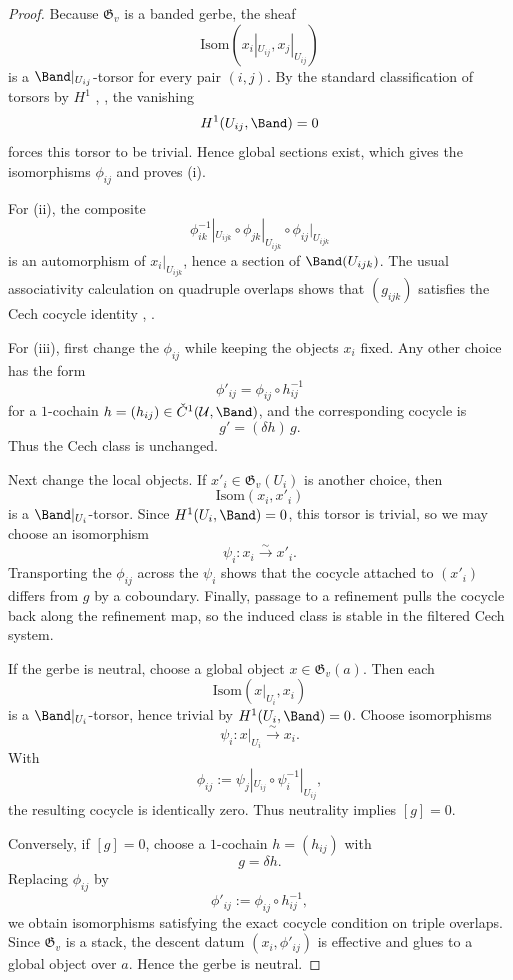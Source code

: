 \begin{proof}
Because $\mathfrak G_v$ is a banded gerbe, the sheaf
\[
\mathrm{Isom}(x_i|_{U_{ij}},x_j|_{U_{ij}})
\]
is a $\Band|_{U_{ij}}$-torsor for every pair $(i,j)$. By the standard classification of torsors by $H^1$ \cite[Chap.~III]{MacLaneMoerdijk1994}, \cite[Sec.~11]{StacksProject}, the vanishing
\[
H^1(U_{ij},\Band)=0
\]
forces this torsor to be trivial. Hence global sections exist, which gives the isomorphisms $\phi_{ij}$ and proves \textup{(i)}.

For \textup{(ii)}, the composite
\[
\phi_{ik}^{-1}|_{U_{ijk}}\circ \phi_{jk}|_{U_{ijk}}\circ \phi_{ij}|_{U_{ijk}}
\]
is an automorphism of $x_i|_{U_{ijk}}$, hence a section of $\Band(U_{ijk})$. The usual associativity calculation on quadruple overlaps shows that $(g_{ijk})$ satisfies the Cech cocycle identity \cite[Chap.~IV]{Giraud1971}, \cite[Sec.~11]{StacksProject}.

For \textup{(iii)}, first change the $\phi_{ij}$ while keeping the objects $x_i$ fixed. Any other choice has the form
\[
\phi'_{ij}=\phi_{ij}\circ h_{ij}^{-1}
\]
for a $1$-cochain $h=(h_{ij})\in \check C^1(\mathcal U,\Band)$, and the corresponding cocycle is
\[
g'=(\delta h)\, g.
\]
Thus the Cech class is unchanged.

Next change the local objects. If $x'_i\in \mathfrak G_v(U_i)$ is another choice, then
\[
\mathrm{Isom}(x_i,x'_i)
\]
is a $\Band|_{U_i}$-torsor. Since $H^1(U_i,\Band)=0$, this torsor is trivial, so we may choose an isomorphism
\[
\psi_i:x_i\xrightarrow{\sim} x'_i.
\]
Transporting the $\phi_{ij}$ across the $\psi_i$ shows that the cocycle attached to $(x'_i)$ differs from $g$ by a coboundary. Finally, passage to a refinement pulls the cocycle back along the refinement map, so the induced class is stable in the filtered Cech system.

If the gerbe is neutral, choose a global object $x\in \mathfrak G_v(a)$. Then each
\[
\mathrm{Isom}(x|_{U_i},x_i)
\]
is a $\Band|_{U_i}$-torsor, hence trivial by $H^1(U_i,\Band)=0$. Choose isomorphisms
\[
\psi_i:x|_{U_i}\xrightarrow{\sim} x_i.
\]
With
\[
\phi_{ij}:=\psi_j|_{U_{ij}}\circ \psi_i^{-1}|_{U_{ij}},
\]
the resulting cocycle is identically zero. Thus neutrality implies $[g]=0$.

Conversely, if $[g]=0$, choose a $1$-cochain $h=(h_{ij})$ with
\[
g=\delta h.
\]
Replacing $\phi_{ij}$ by
\[
\phi'_{ij}:=\phi_{ij}\circ h_{ij}^{-1},
\]
we obtain isomorphisms satisfying the exact cocycle condition on triple overlaps. Since $\mathfrak G_v$ is a stack, the descent datum $(x_i,\phi'_{ij})$ is effective and glues to a global object over $a$. Hence the gerbe is neutral.
\end{proof}

